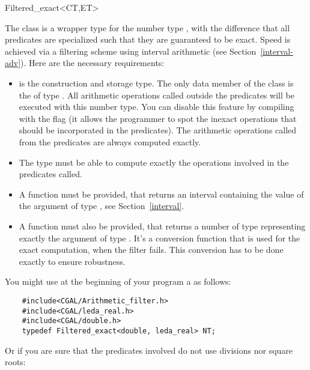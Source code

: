 \begin{ccClass} {Filtered_exact<CT,ET>}
\label{filter}

The class  is a wrapper type for the number
type , with the difference
that all predicates are specialized such that they are guaranteed to be exact.
Speed is achieved via a filtering scheme using interval arithmetic (see
Section~\ref{interval-adv}).  Here are the necessary requirements:

\begin{itemize}
\item {} is the construction and storage type.  The only data member of
      the class  is the  of type
      .
      All arithmetic operations called
      outside the predicates will be executed with this number type.  You can
      disable this feature by compiling with the flag
       (it allows the programmer
      to spot the inexact operations that should be incorporated in the
      predicates).
      The arithmetic operations called from the predicates are always computed
      exactly.
\item The  type must be able to compute exactly the operations involved
      in the predicates called.
\item A  function must
      be provided, that returns an interval containing the value of the
      argument of type , see Section~\ref{interval}.
\item A  function must also be provided, that
      returns a number of type  representing exactly the argument of
      type .  It's a conversion function that is used for the exact
      computation, when the filter fails.
      This conversion has to be done exactly to ensure robustness.
\end{itemize}

\ccExample

You might use at the beginning of your program a  as follows:

\begin{verbatim}
    #include<CGAL/Arithmetic_filter.h>
    #include<CGAL/leda_real.h>
    #include<CGAL/double.h>
    typedef Filtered_exact<double, leda_real> NT;
\end{verbatim}

Or if you are sure that the predicates involved do not use divisions nor
square roots:


\end{ccClass}
